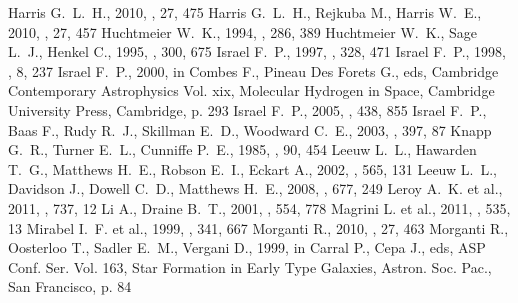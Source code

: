 \begin{thebibliography}{}
 Harris G.~L.~H., 2010, \pasa, 27, 475
 Harris G.~L.~H., Rejkuba M., Harris W.~E., 2010, \pasa, 27, 457
 Huchtmeier W.~K., 1994, \aap, 286, 389
 Huchtmeier W.~K., Sage L.~J., Henkel C., 1995, \aap, 300, 675
 Israel F.~P., 1997, \aap, 328, 471
 Israel F.~P., 1998, \aapr, 8, 237
 Israel F.~P., 2000, in Combes F., Pineau Des Forets G., eds, Cambridge Contemporary Astrophysics Vol. xix,  Molecular Hydrogen in Space, Cambridge University Press, Cambridge, p. 293
 Israel F.~P., 2005, \aap, 438, 855
 Israel F.~P., Baas F., Rudy R.~J., Skillman E.~D., Woodward C.~E., 2003, \aap, 397, 87
 Knapp G.~R., Turner E.~L., Cunniffe P.~E., 1985, \aj, 90, 454
 Leeuw L.~L., Hawarden T.~G., Matthews H.~E., Robson E.~I., Eckart A., 2002, \apj, 565, 131
 Leeuw L.~L., Davidson J., Dowell C.~D., Matthews H.~E., 2008, \apj, 677, 249
 Leroy A.~K. et al., 2011, \apj, 737, 12
 Li A., Draine B.~T., 2001, \apj, 554, 778
 Magrini L. et al., 2011, \aap, 535, 13
 Mirabel I.~F. et al., 1999, \aap, 341, 667
 Morganti R., 2010, \pasa, 27, 463
 Morganti R., Oosterloo T., Sadler E.~M., Vergani D., 1999, in Carral P., Cepa J., eds, ASP Conf. Ser. Vol. 163, Star Formation in Early Type Galaxies, Astron. Soc. Pac., San Francisco, p. 84

\end{thebibliography}
